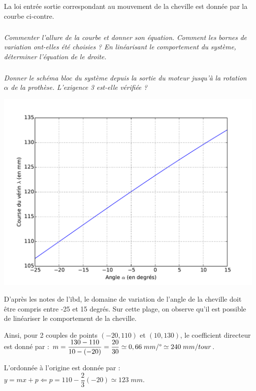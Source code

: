 \documentclass[10pt]{article}
\newif\ifprof
\begin{document}
\else
\fi


\begin{minipage}[c]{.47\linewidth}
La loi entrée sortie correspondant au mouvement de la cheville est donnée par la courbe ci-contre.

\subparagraph{}
\textit{Commenter l'allure de la courbe et donner son équation. Comment les bornes de variation ont-elles été choisies ? En linéarisant le comportement du système, déterminer l'équation de le droite.}


\subparagraph{}
\textit{Donner le schéma bloc du système depuis la sortie du moteur jusqu'à la rotation $\alpha$ de la prothèse. L'exigence 3 est-elle vérifiée ?}

\end{minipage}\hfill
\begin{minipage}[c]{.47\linewidth}
\begin{center}
\includegraphics[width=.95\textwidth]{images/figure_1.pdf}
\end{center}
\end{minipage}


\ifprof
\begin{corrige}
D'après les notes de l'ibd, le domaine de variation de l'angle de la cheville doit être compris entre -25 et 15 degrés. Sur cette plage, on observe qu'il est possible de linéariser le comportement de la cheville. 

 Ainsi, pour 2 couples de points $( -20,110)$ et $(10,130)$, le coefficient directeur est donné par :  $m=\dfrac{130-110}{10-(-20)} = \dfrac{20}{30}\simeq 0,66 \; mm/\text{\textdegree}\simeq 240 \; mm/tour$.
 
 L'ordonnée à l'origine est donnée par : 
 $y=m x+p \Leftarrow p = 110-\dfrac{2}{3} (-20) \simeq 123 \; mm$.  
\end{corrige}
\end{document}
